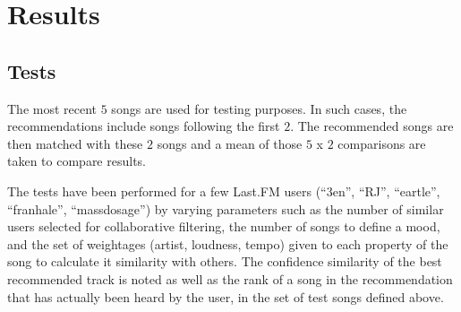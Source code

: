 \chapter{Results}
	\section{Tests}
		The most recent \(5\) songs are used for testing purposes. In such cases, the recommendations include songs following the first \(2\). The recommended songs are then matched with these \(2\) songs and a mean of those \(5\) x \(2\) comparisons are taken to compare results.
		
		The tests have been performed for a few Last.FM users (``3en'', ``RJ'', ``eartle'', ``franhale'', ``massdosage'') by varying parameters such as the number of similar users selected for collaborative filtering, the number of songs to define a mood, and the set of weightages (artist, loudness, tempo) given to each property of the song to calculate it similarity with others. The confidence similarity of the best recommended track is noted as well as the rank of a song in the recommendation that has actually been heard by the user, in the set of test songs defined above.
		
